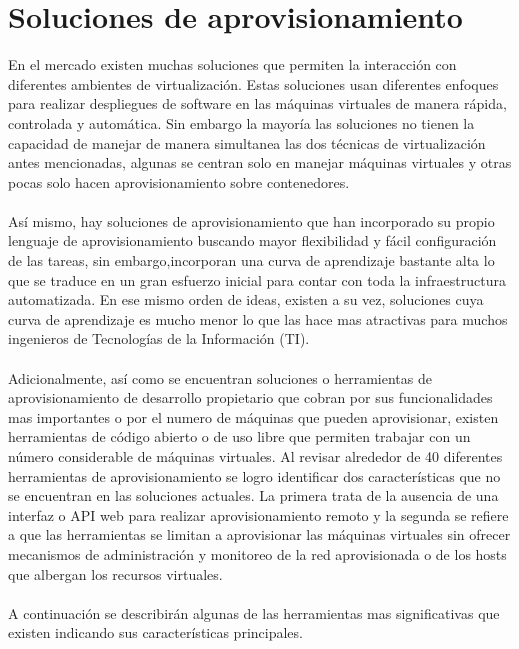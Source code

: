 \section{Soluciones de aprovisionamiento}
En el mercado existen muchas soluciones que permiten la interacción con diferentes ambientes de virtualización. Estas soluciones usan diferentes enfoques para realizar despliegues de software en las máquinas virtuales de manera rápida, controlada y automática. Sin embargo la mayoría las soluciones no tienen la capacidad de manejar de manera simultanea las dos técnicas de virtualización antes mencionadas, algunas se centran solo en manejar máquinas virtuales y otras pocas solo hacen aprovisionamiento sobre contenedores.\\
\\
Así mismo, hay soluciones de aprovisionamiento que han incorporado su propio lenguaje de aprovisionamiento buscando mayor flexibilidad y fácil configuración de las tareas, sin embargo,incorporan una curva de aprendizaje bastante alta lo que se traduce en un gran esfuerzo inicial para contar con toda la infraestructura automatizada. En ese mismo orden de ideas, existen a su vez, soluciones cuya curva de aprendizaje es mucho menor lo que las hace mas atractivas para muchos ingenieros de Tecnologías de la Información (TI).\\
\\
Adicionalmente, así como se encuentran soluciones o herramientas de aprovisionamiento de desarrollo propietario que cobran por sus funcionalidades mas importantes o por el numero de máquinas que pueden aprovisionar, existen herramientas de código abierto o de uso libre que permiten trabajar con un número considerable de máquinas virtuales. Al revisar alrededor de 40 diferentes herramientas de aprovisionamiento se logro identificar dos características que no se encuentran en las soluciones actuales. La primera trata de la ausencia de una interfaz o API web para realizar aprovisionamiento remoto y la segunda se refiere a que las herramientas se limitan a aprovisionar las máquinas virtuales sin ofrecer mecanismos de administración y monitoreo de la red aprovisionada o de los hosts que albergan los recursos virtuales.\\
\\
A continuación se describirán algunas de las herramientas mas significativas que existen indicando sus características principales.

